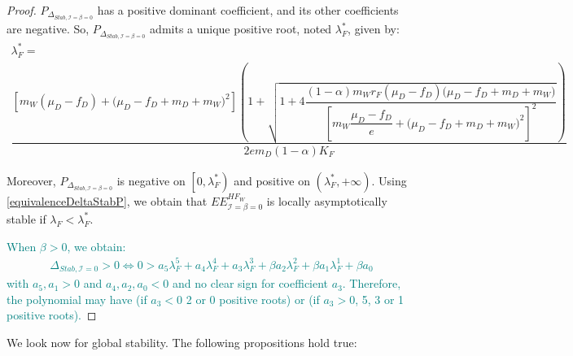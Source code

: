 \documentclass{article}
\newcommand{\lfw}{\lambda_{F}}
\newcommand{\lfw}{\lambda_{F}}
\newcommand{\cI}{\mathcal{I}}
\newcommand{\marc}[1]{\textcolor{teal}{#1}}
\begin{document}
\begin{proof}
$P_{\Delta_{Stab, \cI = \beta = 0}}$ has a positive dominant coefficient, and its other coefficients are negative. So,  $P_{\Delta_{Stab, \cI= \beta = 0}}$ admits a unique positive root, noted $\lfw^*$, given by:
\begin{multline}
\lfw^* = \\
 \dfrac{\left[m_{W}(\mu_{D}-f_{D})+\big(\mu_{D}-f_{D}+m_{D}+m_{W})^{2}\right]\left(1+\sqrt{1+4\dfrac{(1-\alpha)m_{W}r_{F}\left(\mu_{D}-f_{D}\right)\big(\mu_{D}-f_{D}+m_{D}+m_{W})}{\left[m_{W}\dfrac{\mu_{D}-f_{D}}{e}+\big(\mu_{D}-f_{D}+m_{D}+m_{W})^{2}\right]^{2}}}\right)}{2em_D (1-\alpha) K_F }
\end{multline}

Moreover, $P_{\Delta_{Stab, \cI = \beta = 0}}$ is negative on $\left[0, \lfw^* \right)$ and positive on $\left(\lfw ^*, +\infty \right)$. Using \eqref{equivalenceDeltaStabP}, we obtain that $EE^{HF_W}_{\cI = \beta = 0}$ is locally asymptotically stable if $\lfw  < \lfw ^*$.

\marc{
When $\beta > 0$, we obtain:
\begin{multline*}
\Delta_{Stab, \cI = 0} > 0 \Leftrightarrow 0 > a_5 \lfw ^5 + a_4 \lfw ^4 + a_3 \lfw ^3 + \beta a_2 \lfw ^2 + \beta a_1 \lfw ^1 + \beta a_0
\end{multline*}
with $a_5, a_1 > 0$ and $a_4, a_2, a_0 < 0$ and no clear sign for coefficient $a_3$. Therefore, the polynomial may have (if $a_3<0$ 2 or 0 positive roots) or (if $a_3 > 0$, 5, 3 or 1 positive roots).}
\end{proof}

%
%
We look now for global stability. The following propositions hold true:
\end{document}
